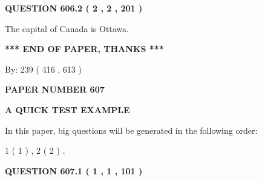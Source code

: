 \documentclass[12pt]{article}
\begin{document}
 
  
\vspace{0.2in}
  
{\textbf{\Large{QUESTION
606.2 
 ( 2 , 2 , 201 )
}}}
  
  
 
 
\noindent{}
 
 
The capital of Canada is Ottawa.
 
 
 
 
   
   
 \vspace{0.2in}
 
   
   
   
   
\vspace{1.0in} 
{\textbf{\large{ *** END OF PAPER, THANKS *** }}} 
   
   
\hspace{1.0in} By: 
 239 ( 416 ,  613 )
   
   
   
   
\newpage 
\setcounter{page}{ 
   607001 } 
   
   
   
   
 {\textbf{ \Large{ PAPER NUMBER  607  }}}
   
   
\vspace{0.2in}
   
   
   
   
   
   
 \vspace{0.2in}
{\LARGE {\textbf{ A QUICK TEST EXAMPLE}}}
   
   
   
\vspace{0.2in}
   
In this paper, big questions will be generated in the following order: 
   
   
   1 ( 1 )
 ,
   2 ( 2 )
 .
  
\vspace{0.2in}
  
{\textbf{\Large{QUESTION
607.1 
 ( 1 , 1 , 101 )
}}}
  
  
 
 
\noindent{}
\end{document}

